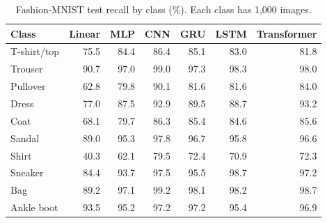 \begin{table}[H]
\centering\small
\caption{Fashion-MNIST test recall by class (\%). Each class has 1,000 images.}
\label{tab:class-recall}
\begin{tabular}{lrrrrrr}
\toprule
Class & Linear & MLP & CNN & GRU & LSTM & Transformer\\\midrule
T-shirt/top & 75.5 & 84.4 & 86.4 & 85.1 & 83.0 & 81.8\\
Trouser & 90.7 & 97.0 & 99.0 & 97.3 & 98.3 & 98.0\\
Pullover & 62.8 & 79.8 & 90.1 & 81.6 & 81.6 & 84.0\\
Dress & 77.0 & 87.5 & 92.9 & 89.5 & 88.7 & 93.2\\
Coat & 68.1 & 79.7 & 86.3 & 85.4 & 84.6 & 85.6\\
Sandal & 89.0 & 95.3 & 97.8 & 96.7 & 95.8 & 96.6\\
Shirt & 40.3 & 62.1 & 79.5 & 72.4 & 70.9 & 72.3\\
Sneaker & 84.4 & 93.7 & 97.5 & 95.5 & 98.7 & 97.2\\
Bag & 89.2 & 97.1 & 99.2 & 98.1 & 98.2 & 98.7\\
Ankle boot & 93.5 & 95.2 & 97.2 & 97.2 & 95.4 & 96.9\\
\bottomrule
\end{tabular}
\end{table}
